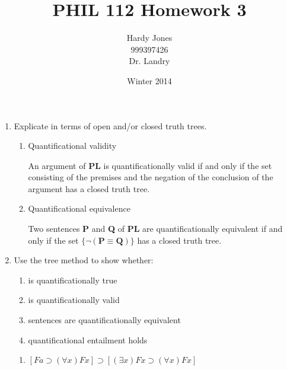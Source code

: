 \documentclass[12pt,letterpaper]{article}
\title{PHIL 112 Homework 3\vspace{-2ex}}
\author{Hardy Jones\\
        999397426\\
        Dr. Landry\vspace{-2ex}}
\date{Winter 2014}
\begin{document}
  \maketitle

  \begin{enumerate}
    \item Explicate in terms of open and/or closed truth trees.
      \begin{enumerate}
        \item Quantificational validity

          An argument of \textbf{PL} is quantificationally valid if and only if
          the set consisting of the premises and the negation of the conclusion
          of the argument has a closed truth tree.

        \item Quantificational equivalence

          Two sentences \textbf{P} and \textbf{Q} of \textbf{PL}
          are quantificationally equivalent if and only if
          the set $\{\neg (\mathbf{P} \equiv \mathbf{Q})\}$ has a closed truth tree.
      \end{enumerate}
    \item
      Use the tree method to show whether:
      \begin{enumerate}
        \item is quantificationally true
        \item is quantificationally valid
        \item sentences are quantificationally equivalent
        \item quantificational entailment holds
      \end{enumerate}
      \begin{enumerate}
        \item
          $[Fa \supset (\forall x)Fx] \supset [(\exists x)Fx \supset (\forall x) Fx]$


\end{enumerate}
\end{enumerate}
\end{document}
